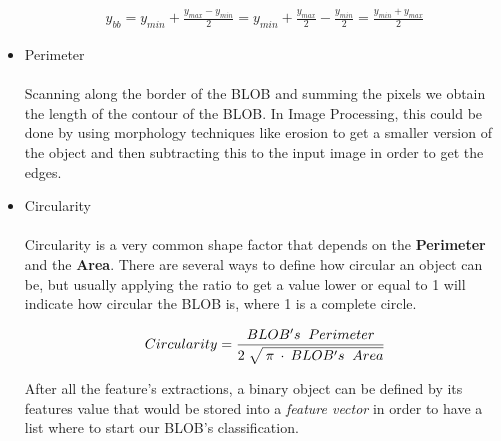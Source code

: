 \begin{itemize}
\begin{equation}	
	\begin{aligned}
	y_{bb}=y_{min}+\displaystyle\frac{y_{max}-y_{min}}{2}=y_{min}+\displaystyle\frac{y_{max}}{2}-\displaystyle\frac{y_{min}}{2}=\displaystyle\frac{y_{min}+y_{max}}{2}
	\label{BoundingBoxCenterY}
	\end{aligned}
\end{equation}


\item Perimeter
\\
\\
Scanning along the border of the BLOB and summing the pixels we obtain the length of the contour of the BLOB. In Image Processing, this could be done by using morphology techniques like erosion to get a smaller version of the object and then subtracting this to the input image in order to get the edges.

\item Circularity
\\
\\
Circularity is a very common shape factor that depends on the \textbf{Perimeter} and the \textbf{Area}. There are several ways to define how circular an object can be, but usually applying the ratio to get a value lower or equal to 1 will indicate how circular the BLOB is, where 1 is a complete circle.

\begin{equation}	
	\begin{aligned}
	{Circularity}=\displaystyle\frac{BLOB's \;\; Perimeter}{2 \; \sqrt{\mathstrut \: \pi \: \cdot \: {BLOB's \;\; Area}}}
	\label{Circularity}
	\end{aligned}
\end{equation}


After all the feature's extractions, a binary object can be defined by its features value that would be stored into a \textit{feature vector} in order to have a list where to start our BLOB's classification.

\end{itemize}



